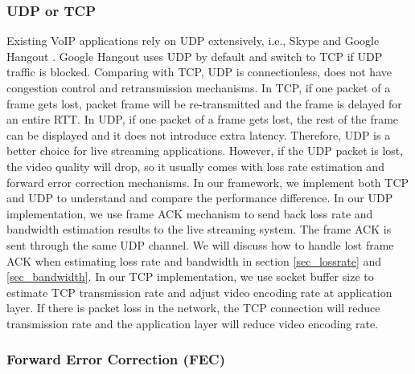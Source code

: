 \subsubsection{UDP or TCP}
\label{sec_udp_tcp}

Existing VoIP applications rely on UDP extensively, 
i.e., Skype \cite{zhang2012profiling} and Google Hangout \cite{yu2014can}.
Google Hangout uses UDP by default and switch to TCP if UDP traffic 
is blocked. 
Comparing with TCP, UDP is connectionless, does not have 
congestion control and retransmission mechanisms. 
In TCP, if one packet of a frame gets lost, 
packet frame will be re-transmitted and 
the frame is delayed for an entire RTT. 
In UDP, if one packet of a frame gets lost, 
the rest of the frame can be displayed and 
it does not introduce extra latency. 
Therefore, UDP is a better choice for live streaming
applications. 
However, if the UDP packet is lost, the video quality
will drop, 
so it usually comes with loss rate estimation and 
forward error correction mechanisms. 
In our framework, we implement both TCP and UDP
to understand and compare the performance difference.
In our UDP implementation, we use frame ACK 
mechanism to send back loss rate and bandwidth
estimation results to the live streaming system. 
The frame ACK is sent through the same UDP channel. 
We will discuss how to handle lost frame ACK
when estimating loss rate and bandwidth in section 
\ref{sec_lossrate} and \ref{sec_bandwidth}. 
In our TCP implementation, we use socket buffer size 
to estimate TCP transmission rate and adjust
video encoding rate at application layer. 
If there is packet loss in the network, the TCP connection
will reduce transmission rate and the application layer
will reduce video encoding rate. 


\subsubsection{Forward Error Correction (FEC)}
\label{sec_fec}


